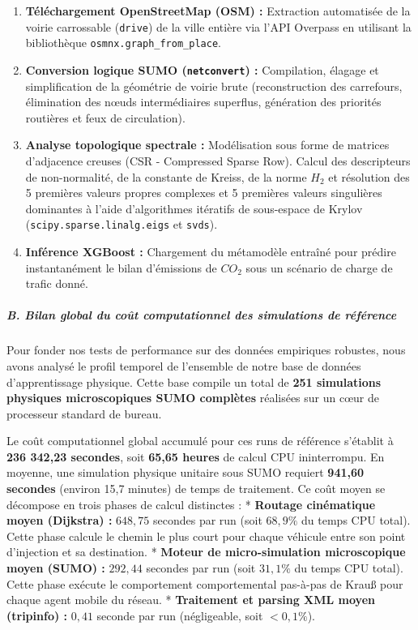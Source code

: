\documentclass[10pt, a4paper]{article}
\providecommand{\tightlist}{}
\begin{document}
\begin{enumerate}
\def\labelenumi{\arabic{enumi}.}
\tightlist
\item
  \textbf{Téléchargement OpenStreetMap (OSM) :} Extraction automatisée
  de la voirie carrossable (\texttt{drive}) de la ville entière via
  l'API Overpass en utilisant la bibliothèque
  \texttt{osmnx.graph\_from\_place}.
\item
  \textbf{Conversion logique SUMO (\texttt{netconvert}) :} Compilation,
  élagage et simplification de la géométrie de voirie brute
  (reconstruction des carrefours, élimination des nœuds intermédiaires
  superflus, génération des priorités routières et feux de circulation).
\item
  \textbf{Analyse topologique spectrale :} Modélisation sous forme de
  matrices d'adjacence creuses (CSR - Compressed Sparse Row). Calcul des
  descripteurs de non-normalité, de la constante de Kreiss, de la norme
  \(H_2\) et résolution des 5 premières valeurs propres complexes et 5
  premières valeurs singulières dominantes à l'aide d'algorithmes
  itératifs de sous-espace de Krylov (\texttt{scipy.sparse.linalg.eigs}
  et \texttt{svds}).
\item
  \textbf{Inférence XGBoost :} Chargement du métamodèle entraîné pour
  prédire instantanément le bilan d'émissions de \(CO_2\) sous un
  scénario de charge de trafic donné.
\end{enumerate}

\subparagraph{B. Bilan global du coût computationnel des simulations de
référence}\label{b.-bilan-global-du-couxfbt-computationnel-des-simulations-de-ruxe9fuxe9rence}

Pour fonder nos tests de performance sur des données empiriques
robustes, nous avons analysé le profil temporel de l'ensemble de notre
base de données d'apprentissage physique. Cette base compile un total de
\textbf{251 simulations physiques microscopiques SUMO complètes}
réalisées sur un cœur de processeur standard de bureau.

Le coût computationnel global accumulé pour ces runs de référence
s'établit à \textbf{236 342,23 secondes}, soit \textbf{65,65 heures} de
calcul CPU ininterrompu. En moyenne, une simulation physique unitaire
sous SUMO requiert \textbf{941,60 secondes} (environ 15,7 minutes) de
temps de traitement. Ce coût moyen se décompose en trois phases de
calcul distinctes : * \textbf{Routage cinématique moyen (Dijkstra) :}
\(648,75\) secondes par run (soit \(68,9\%\) du temps CPU total). Cette
phase calcule le chemin le plus court pour chaque véhicule entre son
point d'injection et sa destination. * \textbf{Moteur de
micro-simulation microscopique moyen (SUMO) :} \(292,44\) secondes par
run (soit \(31,1\%\) du temps CPU total). Cette phase exécute le
comportement comportemental pas-à-pas de Krauß pour chaque agent mobile
du réseau. * \textbf{Traitement et parsing XML moyen (tripinfo) :}
\(0,41\) seconde par run (négligeable, soit \(<0,1\%\)).
\end{document}
